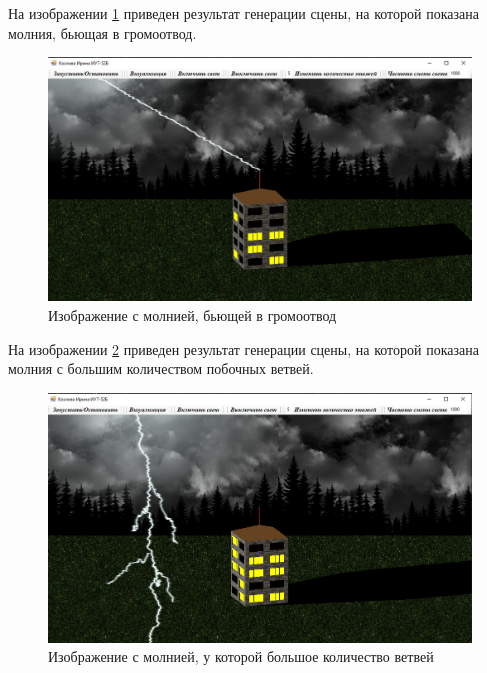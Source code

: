 На изображении \ref{img:t3} приведен результат генерации сцены, на которой показана молния, бьющая в громоотвод.

\begin{figure}[H]
	\begin{center}
		\includegraphics[scale=0.38]{img/prog_res/t3.png}
	\end{center}
	\captionsetup{justification=centering}
	\caption{Изображение с молнией, бьющей в громоотвод}
	\label{img:t3}
\end{figure}

На изображении \ref{img:t4} приведен результат генерации сцены, на которой показана молния с большим количеством побочных ветвей.

\begin{figure}[H]
	\begin{center}
		\includegraphics[scale=0.38]{img/prog_res/t4.png}
	\end{center}
	\captionsetup{justification=centering}
	\caption{Изображение с молнией, у которой большое количество ветвей}
	\label{img:t4}
\end{figure}

